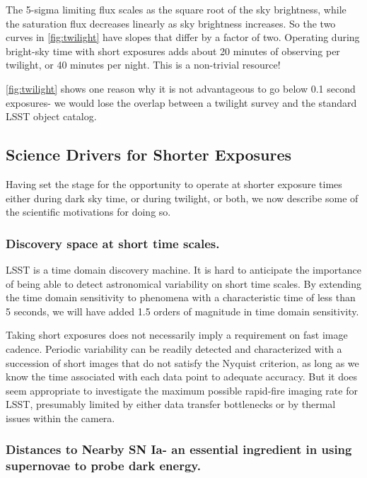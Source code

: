 The 5-sigma limiting flux scales as the square root of the sky
brightness, while the saturation flux decreases linearly as sky
brightness increases. So the two curves in \autoref{fig:twilight} have
slopes that differ by a factor of two. Operating during bright-sky time
with short exposures adds about 20 minutes of observing per twilight, or
40 minutes per night. This is a non-trivial resource!

\autoref{fig:twilight} shows one reason why it is not advantageous to go
below 0.1 second exposures- we would lose the overlap between a twilight
survey and the standard LSST object catalog.



\subsection{Science Drivers for Shorter Exposures}
\label{sec:\secname:drivers}

Having set the stage for the opportunity to operate at shorter exposure
times either during dark sky time, or during twilight, or both, we now
describe some of the scientific motivations for doing so.


\subsubsection{Discovery space at short time scales.}

LSST is a time domain discovery machine. It is hard to anticipate the
importance of being able to detect astronomical variability on short
time scales. By extending the time domain sensitivity to phenomena with
a characteristic time of less than 5 seconds, we will have added 1.5
orders of magnitude in time domain sensitivity.

Taking short exposures does not necessarily imply a requirement on fast
image cadence. Periodic variability can be readily detected and
characterized with a succession of short images that do not satisfy the
Nyquist criterion, as long as we know the time associated with each data
point to adequate accuracy. But it does seem appropriate to investigate
the maximum possible rapid-fire imaging rate for LSST, presumably
limited by either data transfer bottlenecks or by thermal issues within
the camera.

\subsubsection{Distances to Nearby SN Ia- an essential ingredient in using supernovae to probe dark energy.}

